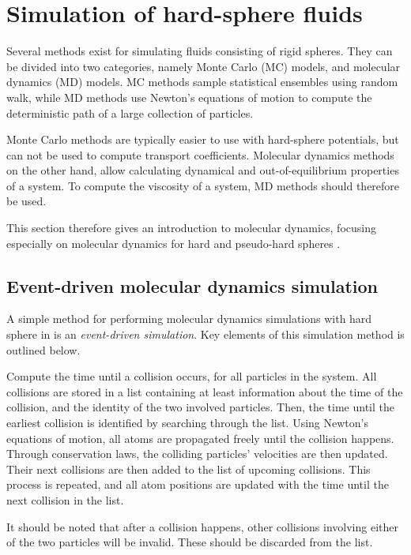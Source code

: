 \chapter{Simulation of hard-sphere fluids}
Several methods exist for simulating fluids 
consisting of rigid spheres. They can be 
divided into two categories, namely Monte 
Carlo (MC) models, and molecular dynamics 
(MD) models. MC methods sample statistical 
ensembles using random walk,  %
while MD methods use Newton's equations of 
motion to compute the deterministic path 
of a large collection of particles.

Monte Carlo methods are typically easier to 
use with hard-sphere potentials, but can not 
be used to compute transport coefficients. 
Molecular dynamics methods on the other 
hand, allow calculating dynamical and 
out-of-equilibrium properties of a system. 
To compute the viscosity of a system, 
MD methods should therefore be used. 

This section therefore gives an introduction 
to molecular dynamics, focusing especially on 
molecular dynamics for hard and pseudo-hard 
spheres \cite{ref:allen:MD_sim}.

\section{Event-driven molecular dynamics simulation}
A simple method for performing molecular 
dynamics simulations with hard sphere in 
is an \emph{event-driven simulation}. 
Key elements of this simulation method 
is outlined below.

Compute the time until a collision occurs, for all particles in the system.
All collisions are stored in a list containing at least information about
the time of the collision, and the identity of the two involved particles.
Then, the time until the earliest collision is identified by searching through the list.
Using Newton's equations of motion, all atoms are propagated freely until
the collision happens.
Through conservation laws, the colliding particles' velocities are then updated.
Their next collisions are then added to the list of upcoming collisions.
This process is repeated, and all atom positions are updated with the time 
until the next collision in the list.

It should be noted that after a collision happens, other collisions involving
either of the two particles will be invalid.
These should be discarded from the list.

